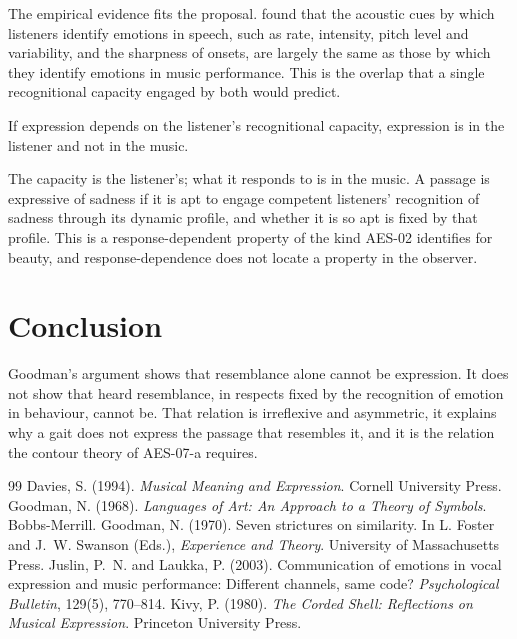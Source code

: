 \documentclass{situationist-preprint}
\begin{document}
The empirical evidence fits the proposal. \citet{JuslinLaukka2003} found that the acoustic cues by which listeners identify emotions in speech, such as rate, intensity, pitch level and variability, and the sharpness of onsets, are largely the same as those by which they identify emotions in music performance. This is the overlap that a single recognitional capacity engaged by both would predict.

\begin{objection}[Projection]
If expression depends on the listener's recognitional capacity, expression is in the listener and not in the music.
\end{objection}

\begin{reply}
The capacity is the listener's; what it responds to is in the music. A passage is expressive of sadness if it is apt to engage competent listeners' recognition of sadness through its dynamic profile, and whether it is so apt is fixed by that profile. This is a response-dependent property of the kind AES-02 identifies for beauty, and response-dependence does not locate a property in the observer.
\end{reply}

\section{Conclusion}

Goodman's argument shows that resemblance alone cannot be expression. It does not show that heard resemblance, in respects fixed by the recognition of emotion in behaviour, cannot be. That relation is irreflexive and asymmetric, it explains why a gait does not express the passage that resembles it, and it is the relation the contour theory of AES-07-a requires.

\begin{thebibliography}{99}\small
{} Davies, S. (1994). \emph{Musical Meaning and Expression}. Cornell University Press.
 Goodman, N. (1968). \emph{Languages of Art: An Approach to a Theory of Symbols}. Bobbs-Merrill.
 Goodman, N. (1970). Seven strictures on similarity. In L. Foster and J.~W. Swanson (Eds.), \emph{Experience and Theory}. University of Massachusetts Press.
 Juslin, P.~N. and Laukka, P. (2003). Communication of emotions in vocal expression and music performance: Different channels, same code? \emph{Psychological Bulletin}, 129(5), 770--814.
 Kivy, P. (1980). \emph{The Corded Shell: Reflections on Musical Expression}. Princeton University Press.
\end{thebibliography}
\end{document}
